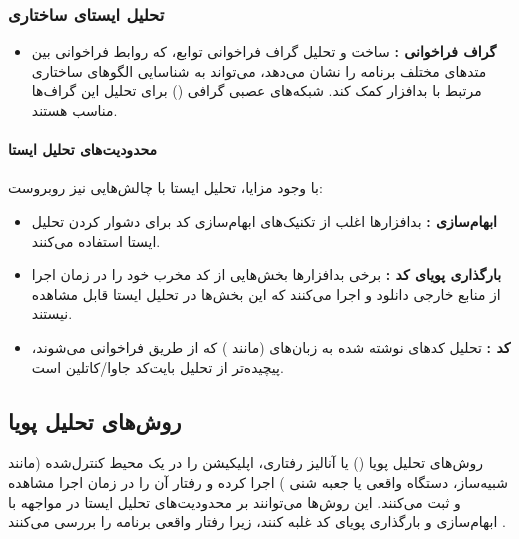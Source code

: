 \subsubsection{تحلیل ایستای ساختاری}
\begin{itemize}
    \renewcommand{\labelitemi}{\lr{$\bullet$}}
    \item \textbf{گراف فراخوانی :} ساخت و تحلیل گراف فراخوانی توابع، که روابط فراخوانی بین متدهای مختلف برنامه را نشان می‌دهد، می‌تواند به شناسایی الگوهای ساختاری مرتبط با بدافزار کمک کند. شبکه‌های عصبی گرافی () برای تحلیل این گراف‌ها مناسب هستند.
\end{itemize}

\paragraph{محدودیت‌های تحلیل ایستا}
با وجود مزایا، تحلیل ایستا با چالش‌هایی نیز روبروست:
\begin{itemize}
    \renewcommand{\labelitemi}{\lr{$\bullet$}}
    \item \textbf{ابهام‌سازی :} بدافزارها اغلب از تکنیک‌های ابهام‌سازی کد  برای دشوار کردن تحلیل ایستا استفاده می‌کنند.
    \item \textbf{بارگذاری پویای کد :} برخی بدافزارها بخش‌هایی از کد مخرب خود را در زمان اجرا از منابع خارجی دانلود و اجرا می‌کنند که این بخش‌ها در تحلیل ایستا قابل مشاهده نیستند.
    \item \textbf{کد :} تحلیل کدهای نوشته شده به زبان‌های  (مانند ) که از طریق  فراخوانی می‌شوند، پیچیده‌تر از تحلیل بایت‌کد جاوا/کاتلین است.
\end{itemize}

\subsection{روش‌های تحلیل پویا}
روش‌های تحلیل پویا () یا آنالیز رفتاری، اپلیکیشن را در یک محیط کنترل‌شده (مانند شبیه‌ساز، دستگاه واقعی یا جعبه شنی ) اجرا کرده و رفتار آن را در زمان اجرا مشاهده و ثبت می‌کنند. این روش‌ها می‌توانند بر محدودیت‌های تحلیل ایستا در مواجهه با ابهام‌سازی و بارگذاری پویای کد غلبه کنند، زیرا رفتار واقعی برنامه را بررسی می‌کنند \cite{AndroidMalwareSurvey}.

